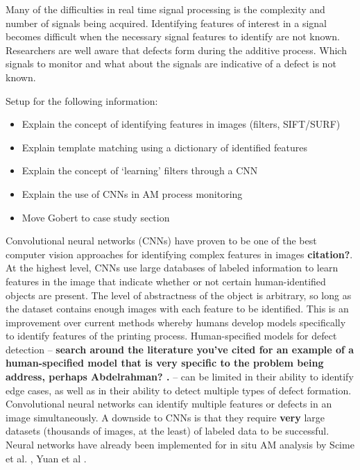 Many of the difficulties in real time signal processing is the complexity and number of signals being acquired. Identifying features of interest in a signal becomes difficult when the necessary signal features to identify are not known. Researchers are well aware that defects form during the additive process. Which signals to monitor and what about the signals are indicative of a defect is not known. 

Setup for the following information:
\begin{itemize}	
	\item Explain the concept of identifying features in images (filters, SIFT/SURF)
	\item Explain template matching using a dictionary of identified features
	\item Explain the concept of `learning' filters through a CNN
	\item Explain the use of CNNs in AM process monitoring
	\item Move Gobert to case study section
\end{itemize}

Convolutional neural networks (CNNs) have proven to be one of the best computer vision approaches for identifying complex features in images \textbf{citation?}. At the highest level, CNNs use large databases of labeled information to learn features in the image that indicate whether or not certain human-identified objects are present. The level of abstractness of the object is arbitrary, so long as the dataset contains enough images with each feature to be identified. This is an improvement over current methods whereby humans develop models specifically to identify features of the printing process. Human-specified models for defect detection -- \textbf{search around the literature you've cited for an example of a human-specified model that is very specific to the problem being address, perhaps Abdelrahman? \cite{Abdelrahman2017}.} -- can be limited in their ability to identify edge cases, as well as in their ability to detect multiple types of defect formation. Convolutional neural networks can identify multiple features or defects in an image simultaneously. A downside to CNNs is that they require \textbf{very} large datasets (thousands of images, at the least) of labeled data to be successful. Neural networks have already been implemented for in situ AM analysis by Scime et al. \cite{Scime2018}, Yuan et al \cite{Yuan2018}. 

